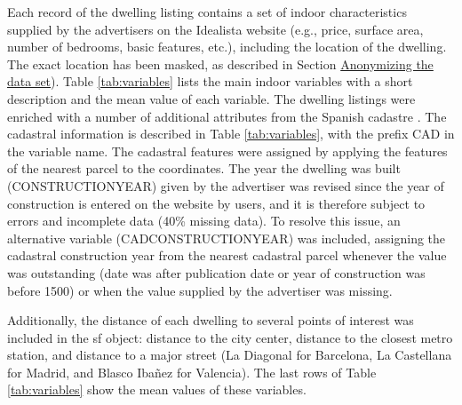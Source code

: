 \documentclass[Royal,times,sageh]{sagej}
\begin{document}
Each record of the dwelling listing contains a set of indoor
characteristics supplied by the advertisers on the Idealista website
(e.g., price, surface area, number of bedrooms, basic features, etc.),
including the location of the dwelling. The exact location has been
masked, as described in Section
\protect\hyperlink{anonymizing}{Anonymizing the data set}). Table
\ref{tab:variables} lists the main indoor variables with a short
description and the mean value of each variable. The dwelling listings
were enriched with a number of additional attributes from the Spanish
cadastre \citep{Catastro}. The cadastral information is described in
Table \ref{tab:variables}, with the prefix CAD in the variable name. The
cadastral features were assigned by applying the features of the nearest
parcel to the coordinates. The year the dwelling was built
(CONSTRUCTIONYEAR) given by the advertiser was revised since the year of
construction is entered on the website by users, and it is therefore
subject to errors and incomplete data (40\% missing data). To resolve
this issue, an alternative variable (CADCONSTRUCTIONYEAR) was included,
assigning the cadastral construction year from the nearest cadastral
parcel whenever the value was outstanding (date was after publication
date or year of construction was before 1500) or when the value supplied
by the advertiser was missing.

Additionally, the distance of each dwelling to several points of
interest was included in the sf object: distance to the city center,
distance to the closest metro station, and distance to a major street
(La Diagonal for Barcelona, La Castellana for Madrid, and Blasco Ibañez
for Valencia). The last rows of Table \ref{tab:variables} show the mean
values of these variables.
\end{document}

